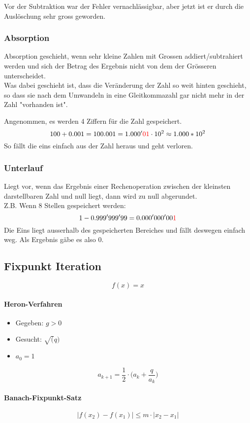 Vor der Subtraktion war der Fehler vernachlässigbar, aber jetzt ist er durch die Auslöschung sehr gross geworden.

\subsubsection{Absorption}
Absorption geschieht, wenn sehr kleine Zahlen mit Grossen addiert/subtrahiert werden und sich der Betrag des Ergebnis nicht von dem der Grösseren unterscheidet. \\
Was dabei geschieht ist, dass die Veränderung der Zahl so weit hinten geschieht, so dass sie nach dem Umwandeln in eine Gleitkommazahl gar nicht mehr in der Zahl "vorhanden ist".
\begin{exmp}
	Angenommen, es werden 4 Ziffern für die Zahl gespeichert.
	\begin{displaymath}
		100+0.001=100.001 = 1.000'{\color{red}01} \cdot 10^2
		\approx 1.000 * 10^2
	\end{displaymath}
	So fällt die eins einfach aus der Zahl heraus und geht verloren.
\end{exmp}

\subsubsection{Unterlauf}
Liegt vor, wenn das Ergebnis einer Rechenoperation zwischen der kleinsten darstellbaren Zahl und null liegt, dann wird zu null abgerundet. \\
Z.B. Wenn 8 Stellen gespeichert werden:
\begin{displaymath}
	1-0.999'999'99 = 0.000'000'00 {\color{red} 1}
\end{displaymath}
Die Eins liegt ausserhalb des gespeicherten Bereiches und fällt deswegen einfach weg. Als Ergebnis gäbe es also  0.

\subsection{Fixpunkt Iteration}

\begin{displaymath}
	f(x) = x
\end{displaymath}

\paragraph{Heron-Verfahren}

\begin{itemize}
	\item Gegeben: $g > 0$
	\item Gesucht: $\sqrt(q)$
	\item $a_0 = 1$
\end{itemize}

\begin{displaymath}
	a_{k+1} = \frac{1}{2} \cdot \biggl ( a_k + \frac{q}{a_k} \biggr )
\end{displaymath}

\paragraph{Banach-Fixpunkt-Satz}

\begin{displaymath}
	|f(x_2) - f(x_1)| \leq	m \cdot |x_2 - x_1|
\end{displaymath}